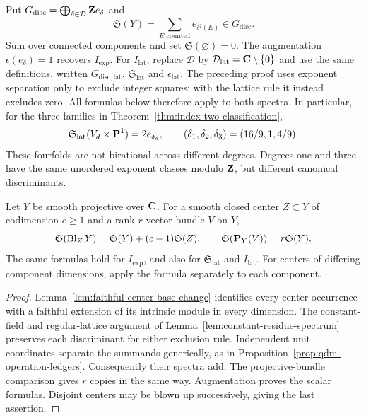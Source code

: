 Put $G_{\mathrm{disc}}=\bigoplus_{\delta\in\mathcal D}\mathbf Z e_\delta$ and
\[
 \mathfrak S(Y)=\sum_{E\text{ counted}}e_{\delta^\sharp(E)}
 \in G_{\mathrm{disc}}.
\]
Sum over connected components and set $\mathfrak S(\varnothing)=0$.
The augmentation $\epsilon(e_\delta)=1$ recovers $I_{\mathrm{exp}}$.
For $I_{\mathrm{lat}}$, replace $\mathcal D$ by
$\mathcal D_{\mathrm{lat}}=\mathbf C\setminus\{0\}$ and use the same definitions,
written $G_{\mathrm{disc,lat}}$, $\mathfrak S_{\mathrm{lat}}$ and
$\epsilon_{\mathrm{lat}}$. The preceding proof uses exponent separation
only to exclude integer squares; with the lattice rule it instead excludes
zero. All formulas below therefore apply to both spectra.
In particular, for the three families in
Theorem~\ref{thm:index-two-classification},
\[
 \mathfrak S_{\mathrm{lat}}(V_d\times\mathbf P^1)=2e_{\delta_d},
 \qquad (\delta_1,\delta_2,\delta_3)=(16/9,1,4/9).
\]
These fourfolds are not birational across different degrees.  Degrees one
and three have the same unordered exponent classes modulo \(\mathbf Z\), but
different canonical discriminants.

\begin{proposition}
\label{prop:intrinsic-spectrum-formulas}
%
%
Let \(Y\) be smooth projective over \(\mathbf C\).  For a smooth closed center
\(Z\subset Y\) of codimension \(c\geq1\) and
a rank-\(r\) vector bundle \(V\) on \(Y\),
\[
 \mathfrak S(\operatorname{Bl}_ZY)=\mathfrak S(Y)+(c-1)\mathfrak S(Z),
 \qquad \mathfrak S(\mathbf P_Y(V))=r\mathfrak S(Y).
\]
The same formulas hold for \(I_{\mathrm{exp}}\), and also for
\(\mathfrak S_{\mathrm{lat}}\) and \(I_{\mathrm{lat}}\).  For centers of differing
component dimensions, apply the formula separately to each component.
\end{proposition}

\begin{proof}
Lemma~\ref{lem:faithful-center-base-change} identifies every center
occurrence with a faithful extension of its intrinsic module in every
dimension.  The constant-field and regular-lattice argument of
Lemma~\ref{lem:constant-residue-spectrum} preserves each discriminant
for either exclusion rule.  Independent unit coordinates separate the summands
generically, as in Proposition~\ref{prop:qdm-operation-ledgers}.
Consequently their spectra add.  The projective-bundle comparison gives
\(r\) copies in the same way.  Augmentation proves the scalar formulas.
Disjoint centers may be blown up successively, giving the last assertion.
%
\end{proof}

